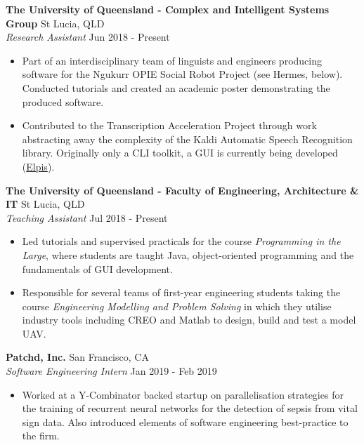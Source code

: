 \documentclass[a4paper]{article}
\newenvironment{myitemize}
{   \small
    \vspace{-2pt}
    \begin{itemize}
    \setlength{\itemsep}{0pt}
    \setlength{\parskip}{0pt}
    \setlength{\parsep}{0pt}     }
{ \end{itemize}                  }
\begin{document}
\textbf{The University of Queensland - Complex and Intelligent Systems Group} \hfill St Lucia, QLD\\
\textit{Research Assistant} \hfill Jun 2018 - Present\\
\vspace{-0.5mm}
\begin{myitemize} \itemsep 0.5mm
	\item Part of an interdisciplinary team of linguists and engineers producing software for the Ngukurr OPIE Social Robot Project (see Hermes, below). Conducted tutorials and created an academic poster demonstrating the produced software.
	\item Contributed to the Transcription Acceleration Project through work abstracting away the complexity of the Kaldi Automatic Speech Recognition library. Originally only a CLI toolkit, a GUI is currently being developed (\href{https://github.com/CoEDL/elpis}{Elpis}).
\end{myitemize}
\vspace{-1mm}
\textbf{The University of Queensland - Faculty of Engineering, Architecture \& IT} \hfill St Lucia, QLD\\
\textit{Teaching Assistant} \hfill Jul 2018 - Present\\
\vspace{-0.5mm}
\begin{myitemize} \itemsep 0.5mm
	\item Led tutorials and supervised practicals for the course \textit{Programming in the Large}, where students are taught Java, object-oriented programming and the fundamentals of GUI development.
	\item Responsible for several teams of first-year engineering students taking the course \textit{Engineering Modelling and Problem Solving} in which they utilise industry tools including CREO and Matlab to design, build and test a model UAV.
\end{myitemize}
\vspace{-1mm}
\textbf{Patchd, Inc.} \hfill San Francisco, CA\\
\textit{Software Engineering Intern} \hfill  Jan 2019 - Feb 2019\\
\vspace{-0.5mm}
\begin{myitemize} \itemsep 0.5mm
	\item Worked at a Y-Combinator backed startup on parallelisation strategies for the training of recurrent neural networks for the detection of sepsis from vital sign data. Also introduced elements of software engineering best-practice to the firm.
\end{myitemize}
\end{document}
